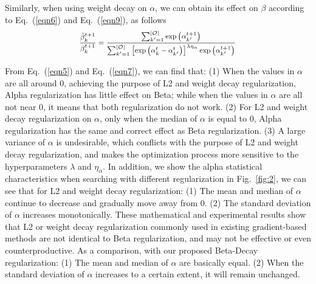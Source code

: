\documentclass[10pt,twocolumn,letterpaper]{article}
\begin{document}
Similarly, when using weight decay on $\alpha$, we can obtain its effect on $\beta$ according to Eq.~(\ref{eqn6}) and Eq.~(\ref{eqn9}), as follows
\begin{equation} \label{eqn7}
\footnotesize
  \begin{split}
    \frac{\bar{\beta}_{k}^{t+1}}{\beta_{k}^{t+1}}=\frac{\sum_{k^{\prime}=1}^{\left | \mathcal{O}\right |} \exp \left(\alpha_{k^{\prime}}^{t+1}\right)}{\sum_{k^{\prime}=1}^{\left | \mathcal{O}\right |} \left[\exp \left(\alpha_{k}^{t}-\alpha_{k^{\prime}}^{t}\right)\right]^{\lambda \eta_{\alpha}} \exp \left(\alpha_{k^{\prime}}^{t+1}\right)}
  \end{split}
  \vspace{-6pt}
\end{equation}

From Eq.~(\ref{eqn5}) and Eq.~(\ref{eqn7}), we can find that: (1) When the values in $\alpha$ are all around 0, achieving the purpose of L2 and weight decay regularization, Alpha regularization has little effect on Beta; while when the values in $\alpha$ are all not near 0, it means that both regularization do not work. (2) For L2 and weight decay regularization on $\alpha$, only when the median of $\alpha$ is equal to 0, Alpha regularization has the same and correct effect as Beta regularization. (3) A large variance of $\alpha$ is undesirable, which conflicts with the purpose of L2 and weight decay regularization, and makes the optimization process more sensitive to the hyperparameters $\lambda$ and $\eta_{\alpha}$. In addition, we show the alpha statistical characteristics when searching with different regularization in Fig.~\ref{fig:2}, we can see that for L2 and weight decay regularization: (1) The mean and median of $\alpha$ continue to decrease and gradually move away from 0. (2) The standard deviation of $\alpha$ increases monotonically. These mathematical and experimental results show that L2 or weight decay regularization commonly used in existing gradient-based methods are not identical to Beta regularization, and may not be effective or even counterproductive. As a comparison, with our proposed Beta-Decay regularization: (1) The mean and median of $\alpha$ are basically equal. (2) When the standard deviation of $\alpha$ increases to a certain extent, it will remain unchanged. 
\end{document}
